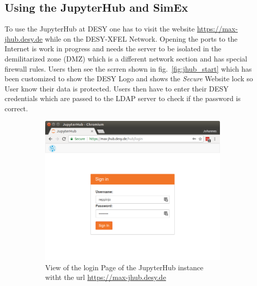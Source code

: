 \documentclass[10pt]{scrartcl}
\begin{document}
\subsection{Using the JupyterHub and SimEx}
To use the JupyterHub at DESY one has to visit the website \url{https://max-jhub.desy.de} while on the DESY-XFEL Network.
Opening the ports to the Internet is work in progress and needs the server to be isolated in the demilitarized zone (DMZ) which is a different network section and has special firewall rules.
Users then see the scrren shown in fig.~\ref{fig:jhub_start} which has been customized to show the DESY Logo and shows the \textit{Secure} Website lock so User know their data is protected.
Users then have to enter their DESY credentials which are passed to the LDAP server to check if the password is correct.
%
\begin{figure}
  \centering
  \begin{subfigure}{0.45\textwidth} %
	  \includegraphics[width=\textwidth]{figures/jhub001.png}
	  \caption{View of the login Page of the JupyterHub instance witht the url
        \url{https://max-jhub.desy.de}} %
  \end{subfigure}
  \vspace{1em} %
  \begin{subfigure}{0.45\textwidth} %

\end{subfigure}
\end{figure}
\end{document}
